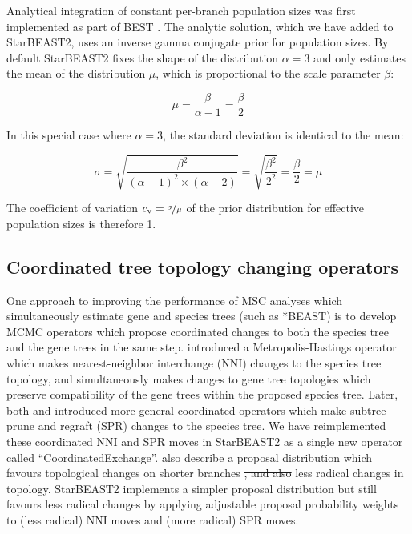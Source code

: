 \documentclass[12pt]{article}
\providecommand{\DIFaddtex}[1]{{\protect\color{blue}\uwave{#1}}} %
\providecommand{\DIFdeltex}[1]{{\protect\color{red}\sout{#1}}}                      %
\providecommand{\DIFaddbegin}{} %
\providecommand{\DIFaddend}{} %
\providecommand{\DIFdelbegin}{} %
\providecommand{\DIFdelend}{} %
\providecommand{\DIFadd}[1]{\texorpdfstring{\DIFaddtex{#1}}{#1}} %
\providecommand{\DIFdel}[1]{\texorpdfstring{\DIFdeltex{#1}}{}} %
\begin{document}
Analytical integration of constant per-branch population sizes was first
implemented as part of BEST \citep{EVO:EVO414}. The analytic solution, which we
have added to StarBEAST2, uses an inverse gamma conjugate prior for population
sizes. By default StarBEAST2 fixes the shape of the distribution $\alpha = 3$
and only estimates the mean of the distribution $\mu$, which is proportional to the
scale parameter $\beta$:

\begin{equation}
\mu = \frac{\beta}{\alpha - 1} = \frac{\beta}{2}
\end{equation}

In this special case where $\alpha = 3$, the standard deviation is identical to
the mean:

\begin{equation}
\sigma = \sqrt{\frac{\beta^2}{(\alpha - 1)^2 \times (\alpha - 2)}} = \sqrt{\frac{\beta^2}{2^2}} = \frac{\beta}{2} = \mu
\end{equation}

The coefficient of variation $c_\mathrm{v} = \nicefrac{\sigma}{\mu}$ of the
prior distribution for effective population sizes is therefore 1.

\subsection{Coordinated tree topology changing operators}

One approach to improving the performance of MSC analyses which simultaneously
estimate gene and species trees (such as *BEAST) is to develop MCMC operators
which propose coordinated changes to both the species tree and the gene trees in
the same step. \cite{Yang01122014} introduced a Metropolis-Hastings \citep[MH;][]{Metropolis1953, Hastings1970}
operator which makes nearest-neighbor interchange (NNI) changes to the species
tree topology, and simultaneously makes changes to gene tree topologies which
preserve compatibility of the gene trees within the proposed species tree.
Later, both \cite{Jones2016} and \cite{2015arXiv151203843R} introduced more
general coordinated operators which make subtree prune and regraft (SPR) changes
to the species tree. We have reimplemented these coordinated NNI and SPR moves
in StarBEAST2 as a single new operator called ``CoordinatedExchange''.
\cite{2015arXiv151203843R} also describe a proposal distribution which favours
topological changes on shorter branches \DIFdelbegin \DIFdel{, and also }\DIFdelend \DIFaddbegin \DIFadd{as well as }\DIFaddend less radical changes in
topology. StarBEAST2 implements a simpler proposal distribution but still
favours less radical changes by applying adjustable proposal probability weights
to (less radical) NNI moves and (more radical) SPR moves.
\end{document}
